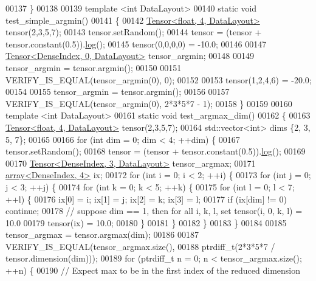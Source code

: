 \begin{DoxyCode}
00137 \}
00138 
00139 \textcolor{keyword}{template} <\textcolor{keywordtype}{int} DataLayout>
00140 \textcolor{keyword}{static} \textcolor{keywordtype}{void} test\_simple\_argmin()
00141 \{
00142   \hyperlink{class_eigen_1_1_tensor}{Tensor<float, 4, DataLayout>} tensor(2,3,5,7);
00143   tensor.setRandom();
00144   tensor = (tensor + tensor.constant(0.5)).\hyperlink{structlog}{log}();
00145   tensor(0,0,0,0) = -10.0;
00146 
00147   \hyperlink{class_eigen_1_1_tensor}{Tensor<DenseIndex, 0, DataLayout>} tensor\_argmin;
00148 
00149   tensor\_argmin = tensor.argmin();
00150 
00151   VERIFY\_IS\_EQUAL(tensor\_argmin(0), 0);
00152 
00153   tensor(1,2,4,6) = -20.0;
00154 
00155   tensor\_argmin = tensor.argmin();
00156 
00157   VERIFY\_IS\_EQUAL(tensor\_argmin(0), 2*3*5*7 - 1);
00158 \}
00159 
00160 \textcolor{keyword}{template} <\textcolor{keywordtype}{int} DataLayout>
00161 \textcolor{keyword}{static} \textcolor{keywordtype}{void} test\_argmax\_dim()
00162 \{
00163   \hyperlink{class_eigen_1_1_tensor}{Tensor<float, 4, DataLayout>} tensor(2,3,5,7);
00164   std::vector<int> dims \{2, 3, 5, 7\};
00165 
00166   \textcolor{keywordflow}{for} (\textcolor{keywordtype}{int} dim = 0; dim < 4; ++dim) \{
00167     tensor.setRandom();
00168     tensor = (tensor + tensor.constant(0.5)).\hyperlink{structlog}{log}();
00169 
00170     \hyperlink{class_eigen_1_1_tensor}{Tensor<DenseIndex, 3, DataLayout>} tensor\_argmax;
00171     \hyperlink{class_eigen_1_1array}{array<DenseIndex, 4>} ix;
00172     \textcolor{keywordflow}{for} (\textcolor{keywordtype}{int} i = 0; i < 2; ++i) \{
00173       \textcolor{keywordflow}{for} (\textcolor{keywordtype}{int} j = 0; j < 3; ++j) \{
00174         \textcolor{keywordflow}{for} (\textcolor{keywordtype}{int} k = 0; k < 5; ++k) \{
00175           \textcolor{keywordflow}{for} (\textcolor{keywordtype}{int} l = 0; l < 7; ++l) \{
00176             ix[0] = i; ix[1] = j; ix[2] = k; ix[3] = l;
00177             \textcolor{keywordflow}{if} (ix[dim] != 0) \textcolor{keywordflow}{continue};
00178             \textcolor{comment}{// suppose dim == 1, then for all i, k, l, set tensor(i, 0, k, l) = 10.0}
00179             tensor(ix) = 10.0;
00180           \}
00181         \}
00182       \}
00183     \}
00184 
00185     tensor\_argmax = tensor.argmax(dim);
00186 
00187     VERIFY\_IS\_EQUAL(tensor\_argmax.size(),
00188                     ptrdiff\_t(2*3*5*7 / tensor.dimension(dim)));
00189     \textcolor{keywordflow}{for} (ptrdiff\_t n = 0; n < tensor\_argmax.size(); ++n) \{
00190       \textcolor{comment}{// Expect max to be in the first index of the reduced dimension}

\end{DoxyCode}
